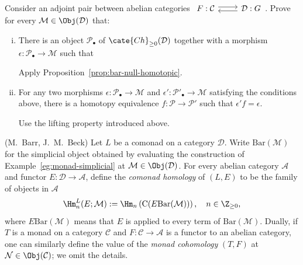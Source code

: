 	\item Consider an adjoint pair between abelian categories
	$\begin{tikzcd}
		F: \mathcal{C} \arrow[shift left, r] & \mathcal{D}: G \arrow[shift left, l]
	\end{tikzcd}$.
	Prove for every $\mathcal{M}\in\Obj(\mathcal{D})$ that:
	\begin{enumerate}[(i)]
		\item There is an object $\mathcal{P}_\bullet$ of
		$\cate{Ch}_{\geq0}(\mathcal{D})$ together with a morphism
		$\epsilon:\mathcal{P}_\bullet\to\mathcal{M}$ such that
		\begin{hint}
			Apply Proposition~\ref{prop:bar-null-homotopic}.
		\end{hint}
		\item For any two morphisms
		$\epsilon:\mathcal{P}_\bullet\to\mathcal{M}$ and
		$\epsilon':\mathcal{P}'_\bullet\to\mathcal{M}$ satisfying the
		conditions above, there is a homotopy equivalence
		$f:\mathcal{P}\to\mathcal{P}'$ such that $\epsilon'f=\epsilon$.
		\begin{hint}
			Use the lifting property introduced above.
		\end{hint}
	\end{enumerate}

	\item (M.\ Barr, J.\ M.\ Beck) Let $L$ be a comonad on a category
	$\mathcal{D}$. Write $\mathrm{Bar}(\mathcal{M})$ for the simplicial
	object obtained by evaluating the construction of
	Example~\ref{eg:monad-simplicial} at
	$\mathcal{M}\in\Obj(\mathcal{D})$. For every abelian category
	$\mathcal{A}$ and functor $E:\mathcal{D}\to\mathcal{A}$, define the
	\emph{comonad homology} of $(L,E)$ to be the family of objects in
	$\mathcal{A}$
	\[ \Hm^L_n(E; \mathcal{M}) := \Hm_n\left( \mathrm{C}(E\mathrm{Bar}(\mathcal{M})) \right), \quad n \in \Z_{\geq 0}, \]
	where $E\mathrm{Bar}(\mathcal{M})$ means that $E$ is applied to every term
	of $\mathrm{Bar}(\mathcal{M})$. Dually, if $T$ is a monad on a category
	$\mathcal{C}$ and $F:\mathcal{C}\to\mathcal{A}$ is a functor to an
	abelian category, one can similarly define the value of the \emph{monad
	cohomology} $(T,F)$ at $\mathcal{N}\in\Obj(\mathcal{C})$; we omit the
	details.

